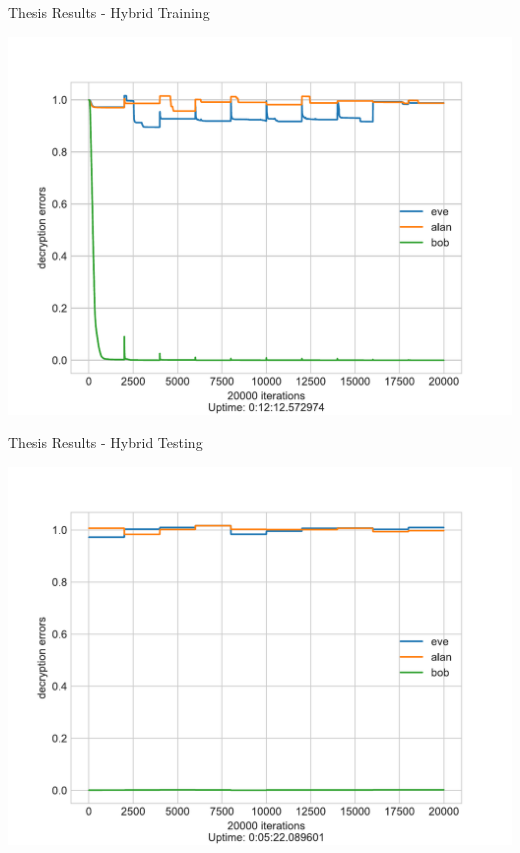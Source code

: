 \documentclass{beamer}
\begin{document}
		\begin{frame}{Thesis Results - Hybrid Training}
			\begin{center}
				\includegraphics[height=0.9\textheight]{neurencoder-hybrid-training}
			\end{center}
		\end{frame}
		\begin{frame}{Thesis Results - Hybrid Testing}
			\begin{center}
				\includegraphics[height=0.9\textheight]{neurencoder-hybrid-testing}
			\end{center}
		\end{frame}
\end{document}
